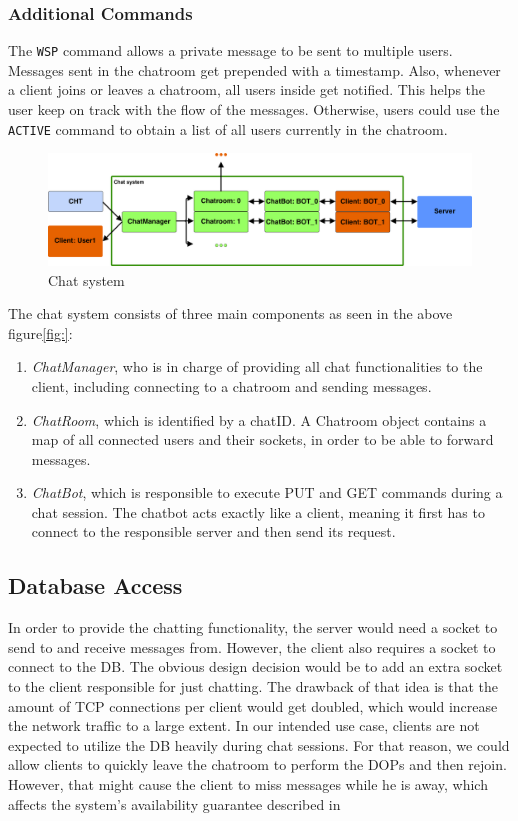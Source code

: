 \subsubsection{Additional Commands}
\label{sec:groupchat_funtionalities_commands}
The \texttt{WSP} command allows a private message to be sent to multiple users.
Messages sent in the chatroom get prepended with a timestamp. Also, whenever a client joins or leaves a chatroom, all users inside get notified. This helps the user keep on track with the flow of the messages. Otherwise, users could use the \texttt{ACTIVE} command to obtain a list of all users currently in the chatroom. 

\begin{figure}[h]
	\centering
	\includegraphics[width=\linewidth]{figures/chat/chat_arch.png}
	\caption{Chat system}
\end{figure}

The chat system consists of three main components as seen in the above figure\ref{fig:}:
\begin{enumerate}
	\item \textit{ChatManager}, who is in charge of providing all chat functionalities to the client, including connecting to a chatroom and sending messages.
	\item \textit{ChatRoom}, which is identified by a chatID. A Chatroom object contains a map of all connected users and their sockets, in order to be able to forward messages.
	\item \textit{ChatBot}, which is responsible to execute PUT and GET commands during a chat session. The chatbot acts exactly like a client, meaning it first has to connect to the responsible server and then send its request.

\end{enumerate}

\subsection{Database Access}
\label{sec:groupchat_chatbot}
In order to provide the chatting functionality, the server would need a socket to send to and receive messages from. However, the client also requires a socket to connect to the DB. The obvious design decision would be to add an extra socket to the client responsible for just chatting. The drawback of that idea is that the amount of TCP connections per client would get doubled, which would increase the network traffic to a large extent. In our intended use case, clients are not expected to utilize the DB heavily during chat sessions. For that reason, we could allow clients to quickly leave the chatroom to perform the DOPs and then rejoin. However, that might cause the client to miss messages while he is away, which affects the system's availability guarantee described in %

